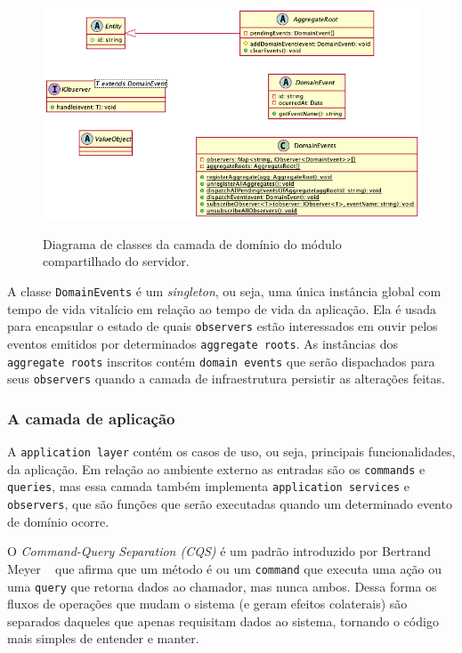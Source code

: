 \begin{figure}[h]
	\caption{\small Diagrama de classes da camada de domínio do módulo compartilhado do servidor.}
	\centering
	\includegraphics[width=\textwidth]{../diagrams/out/system_server_shared-module_domain.png}
	\label{f.system_server_shared-module_domain}
\end{figure}

A classe \texttt{DomainEvents} é um \emph{singleton}, ou seja, uma única instância global com tempo de vida vitalício em relação ao tempo de vida da aplicação. Ela é usada para encapsular o estado de quais \texttt{observers} estão interessados em ouvir pelos eventos emitidos por determinados \texttt{aggregate roots}. As instâncias dos \texttt{aggregate roots} inscritos contém \texttt{domain events} que serão dispachados para seus \texttt{observers} quando a camada de infraestrutura persistir as alterações feitas.

\subsubsection{A camada de aplicação}

A \texttt{application layer} contém os casos de uso, ou seja, principais funcionalidades, da aplicação. Em relação ao ambiente externo as entradas são os \texttt{commands} e \texttt{queries}, mas essa camada também implementa \texttt{application services} e \texttt{observers}, que são funções que serão executadas quando um determinado evento de domínio ocorre.

O \emph{Command-Query Separation (CQS)} é um padrão introduzido por Bertrand Meyer ~\cite{object-oriented-software-construction} que afirma que um método é ou um \texttt{command} que executa uma ação ou uma \texttt{query} que retorna dados ao chamador, mas nunca ambos. Dessa forma os fluxos de operações que mudam o sistema (e geram efeitos colaterais) são separados daqueles que apenas requisitam dados ao sistema, tornando o código mais simples de entender e manter.

